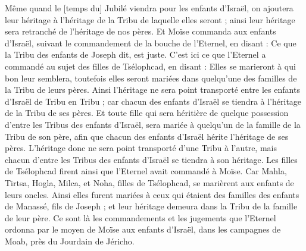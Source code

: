\begin{multicols}{2}
Même quand le [temps du] Jubilé viendra pour les enfants d'Israël, on ajoutera leur héritage à l'héritage de la Tribu de laquelle elles seront ; ainsi leur héritage sera retranché de l'héritage de nos pères.
Et Moïse commanda aux enfants d'Israël, suivant le commandement de la bouche de l'Eternel, en disant : Ce que la Tribu des enfants de Joseph dit, est juste.
C'est ici ce que l'Eternel a commandé au sujet des filles de Tsélophcad, en disant : Elles se marieront à qui bon leur semblera, toutefois elles seront mariées dans quelqu'une des familles de la Tribu de leurs pères.
Ainsi l'héritage ne sera point transporté entre les enfants d'Israël de Tribu en Tribu ; car chacun des enfants d'Israël se tiendra à l'héritage de la Tribu de ses pères.
Et toute fille qui sera héritière de quelque possession d'entre les Tribus des enfants d'Israël, sera mariée à quelqu'un de la famille de la Tribu de son père, afin que chacun des enfants d'Israël hérite l'héritage de ses pères.
L'héritage donc ne sera point transporté d'une Tribu à l'autre, mais chacun d'entre les Tribus des enfants d'Israël se tiendra à son héritage.
Les filles de Tsélophcad firent ainsi que l'Eternel avait commandé à Moïse.
Car Mahla, Tirtsa, Hogla, Milca, et Noha, filles de Tsélophcad, se marièrent aux enfants de leurs oncles.
Ainsi elles furent mariées à ceux qui étaient des familles des enfants de Manassé, fils de Joseph ; et leur héritage demeura dans la Tribu de la famille de leur père.
Ce sont là les commandements et les jugements que l'Eternel ordonna par le moyen de Moïse aux enfants d'Israël, dans les campagnes de Moab, près du Jourdain de Jéricho.
\PPE{}
\end{multicols}

